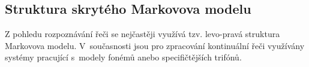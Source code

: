 







\subsection{Struktura skrytého Markovova modelu}
\label{chap:asr:acoustic:HMM}

Z pohledu rozpoznávání řeči se nejčastěji využívá tzv. levo-pravá struktura Markovova modelu.
V~současnosti jsou pro zpracování kontinuální řeči využívány systémy pracující s~modely
fonémů anebo specifičtějších trifónů.

